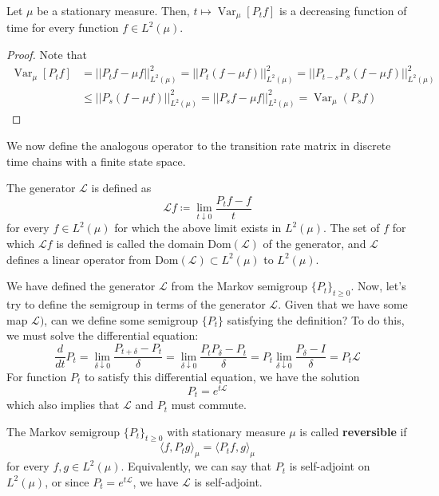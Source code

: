 \documentclass{article}
\DeclareMathOperator{\Var}{Var}
\begin{document}
  \begin{lemma}
  Let $\mu$ be a stationary measure. Then, $t \mapsto \Var_\mu [P_t f]$ is a decreasing function of time for every function $f \in L^2 (\mu)$. 
  \end{lemma}
  \begin{proof}
  Note that 
  \begin{align*}
      \Var_\mu [P_t f] & = ||P_t f - \mu f||^2_{L^2(\mu) } =  ||P_t (f - \mu f)||^2_{L^2 (\mu)} = ||P_{t - s} P_s (f - \mu f)||^2_{L^2 (\mu)} \\
      & \leq ||P_s (f - \mu f)||^2_{L^2 (\mu)} = ||P_s f - \mu f||^2_{L^2 (\mu)} = \Var_\mu (P_s f)
  \end{align*}
  \end{proof}

  We now define the analogous operator to the transition rate matrix in discrete time chains with a finite state space. 

  \begin{definition}[Generator]
  The generator $\mathscr{L}$ is defined as 
  \[\mathscr{L} f \coloneqq \lim_{t \downarrow 0} \frac{P_t f - f}{t}\]
  for every $f \in L^2 (\mu)$ for which the above limit exists in $L^2 (\mu)$. The set of $f$ for which $\mathscr{L}f$ is defined is called the domain $\mathrm{Dom}(\mathscr{L})$ of the generator, and $\mathscr{L}$ defines a linear operator from $\mathrm{Dom}(\mathscr{L}) \subset L^2 (\mu)$ to $L^2 (\mu)$. 
  \end{definition}

  We have defined the generator $\mathscr{L}$ from the Markov semigroup $\{P_t\}_{t \geq 0}$. Now, let's try to define the semigroup in terms of the generator $\mathscr{L}$. Given that we have some map $\mathscr{L})$, can we define some semigroup $\{P_t\}$ satisfying the definition? To do this, we must solve the differential equation: 
  \[\frac{d}{dt} P_t = \lim_{\delta \downarrow 0} \frac{P_{t + \delta} - P_t}{\delta} = \lim_{\delta \downarrow 0} \frac{P_t P_\delta - P_t}{\delta} = P_t \lim_{\delta \downarrow 0} \frac{P_\delta - I}{\delta} = P_t \mathscr{L}\]
  For function $P_t$ to satisfy this differential equation, we have the solution 
  \[P_t = e^{t \mathscr{L}}\]
  which also implies that $\mathscr{L}$ and $P_t$ must commute. 

  \begin{definition}[Reversibility]
  The Markov semigroup $\{P_t\}_{t \geq 0}$ with stationary measure $\mu$ is called \textbf{reversible} if 
  \[\langle f, P_t g \rangle_\mu = \langle P_t f, g \rangle_\mu\]
  for every $f, g \in L^2 (\mu)$. Equivalently, we can say that $P_t$ is self-adjoint on $L^2 (\mu)$, or since $P_t = e^{t \mathscr{L}}$, we have $\mathscr{L}$ is self-adjoint. 
  \end{definition}
\end{document}
